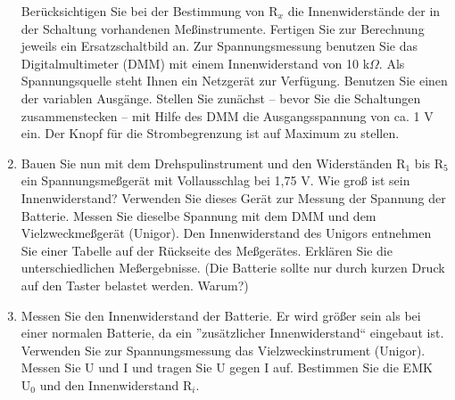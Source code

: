 \documentclass[12pt]{scrartcl}
\begin{document}
\begin{enumerate}
	Berücksichtigen Sie bei 	der Bestimmung 			von $\text{R}_x$ die Innenwiderstände 			der in der Schaltung vorhandenen 				Meßinstrumente. Fertigen Sie zur 				Berechnung jeweils ein Ersatzschaltbild 			an. Zur Spannungsmessung benutzen Sie 			das Digitalmultimeter (DMM) mit einem 			Innenwiderstand von 10 k$\Omega$. Als 			Spannungsquelle steht Ihnen ein 					Netzgerät zur Verfügung. Benutzen Sie 			einen der variablen Ausgänge. Stellen 			Sie zunächst -- bevor Sie die 					Schaltungen 	zusammenstecken -- mit Hilfe 	des DMM die Ausgangsspannung von ca. 			1 V ein. Der Knopf für die 						Strombegrenzung ist auf Maximum zu 				stellen.
	\item
	Bauen Sie nun mit dem Drehspulinstrument 	und den Widerständen $\text{R}_1$ bis 			$\text{R}_5$ ein Spannungsmeßgerät mit 			Vollausschlag bei 1,75 V. Wie groß ist 			sein Innenwiderstand? Verwenden Sie 				dieses Gerät zur Messung der Spannung 			der Batterie. Messen Sie dieselbe 				Spannung mit dem DMM und dem 					Vielzweckmeßgerät (Unigor). Den 					Innenwiderstand des Unigors entnehmen 			Sie einer Tabelle auf der Rückseite des 			Meßgerätes. Erklären Sie die 					unterschiedlichen Meßergebnisse.
	(Die Batterie sollte nur durch 					kurzen Druck auf den Taster belastet 			werden. Warum?)
	
	\item
	Messen Sie den Innenwiderstand der 				Batterie. Er wird größer sein als bei 			einer normalen Batterie, da ein 					”zusätzlicher Innenwiderstand“ eingebaut 	ist. Verwenden Sie zur Spannungsmessung 			das Vielzweckinstrument (Unigor). Messen 	Sie U und I und tragen Sie U gegen I 			auf. Bestimmen Sie die EMK $\text{U}_0$ und 		den Innenwiderstand $\text{R}_i$.
	

\end{enumerate}
\end{document}
